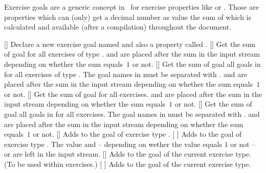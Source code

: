 \documentclass{xsim-manual}
\begin{document}
Exercise goals are a generic concept in \xsim\ for exercise properties like
 or .  Those are properties which can
(only) get a decimal number as value the sum of which is calculated and
available (after a compilation) throughout the document.
\begin{commands}
  []
    Declare a new exercise goal named  and also a property called
    .
  []
    Get the sum of goal  for all exercises of type .
     and  are placed after the sum in the input
    stream depending on whether the sum equals~$1$ or not.
    []
    Get the sum of goal all goals in  for all exercises of
    type .  The goal names in  must be
    separated with \code{+}.  and  are placed
    after the sum in the input stream depending on whether the sum equals~$1$
    or not.
  []
    Get the sum of goal  for all exercises.  and
     are placed after the sum in the input stream depending on
    whether the sum equals~$1$ or not.
  []
    Get the sum of goal all goals in  for all exercises.
    The goal names in  must be separated with
    \code{+}.  and  are placed after the sum in
    the input stream depending on whether the sum equals~$1$ or not.
  []
    Adds  to the goal  of exercise type .
  [%
    ]
    Adds  to the goal  of exercise type .
    The value and -- depending on wether the value equals $1$ or not --
     or  are left in the input stream.
  []
    Adds  to the goal  of the current exercise
    type. (To be used within exercises.)
  [%
    ]
    Adds  to the goal  of the current exercise type.

\end{commands}
\end{document}
